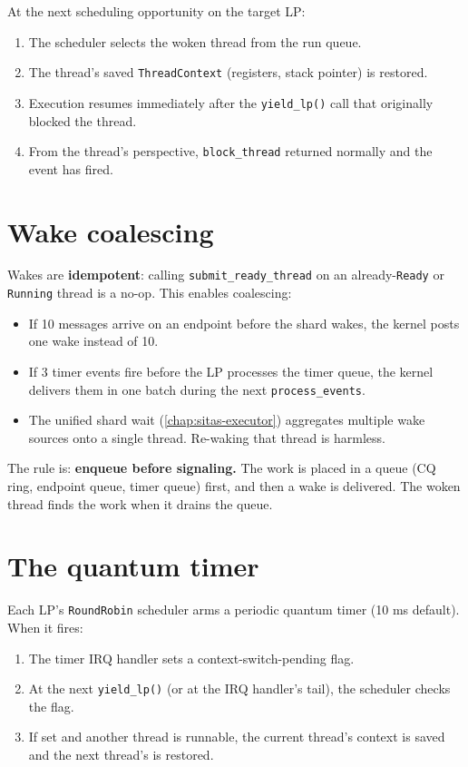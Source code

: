 At the next scheduling opportunity on the target LP:

\begin{enumerate}
    \item The scheduler selects the woken thread from the run queue.
    \item The thread's saved \texttt{ThreadContext} (registers, stack pointer)
        is restored.
    \item Execution resumes immediately after the \texttt{yield\_lp()} call that
        originally blocked the thread.
    \item From the thread's perspective, \texttt{block\_thread} returned normally
        and the event has fired.
\end{enumerate}

\section{Wake coalescing}

Wakes are \textbf{idempotent}: calling \texttt{submit\_ready\_thread} on an
already-\texttt{Ready} or \texttt{Running} thread is a no-op. This enables
coalescing:

\begin{itemize}
    \item If 10 messages arrive on an endpoint before the shard wakes, the kernel
        posts one wake instead of 10.
    \item If 3 timer events fire before the LP processes the timer queue, the
        kernel delivers them in one batch during the next \texttt{process\_events}.
    \item The unified shard wait (\autoref{chap:sitas-executor}) aggregates multiple wake sources onto
        a single thread. Re-waking that thread is harmless.
\end{itemize}

The rule is: \textbf{enqueue before signaling.} The work is placed in a queue
(CQ ring, endpoint queue, timer queue) first, and then a wake is delivered. The
woken thread finds the work when it drains the queue.

\section{The quantum timer}

Each LP's \texttt{RoundRobin} scheduler arms a periodic quantum timer (10 ms
default). When it fires:

\begin{enumerate}
    \item The timer IRQ handler sets a context-switch-pending flag.
    \item At the next \texttt{yield\_lp()} (or at the IRQ handler's tail), the
        scheduler checks the flag.
    \item If set and another thread is runnable, the current thread's context is
        saved and the next thread's is restored.
\end{enumerate}

